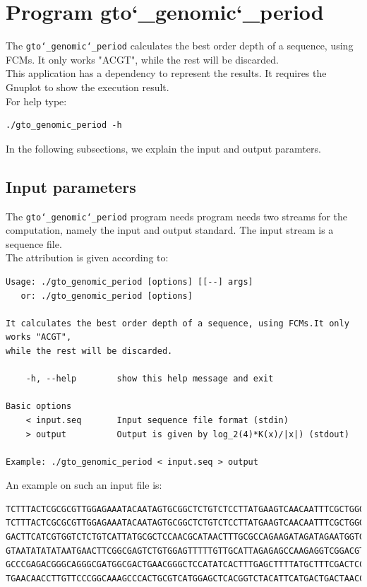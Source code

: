 \section{Program gto\char`_genomic\char`_period}
The \texttt{gto\char`_genomic\char`_period} calculates the best order depth of a sequence, using FCMs. It only works "ACGT", while the rest will be discarded.\\
This application has a dependency to represent the results. It requires the Gnuplot to show the execution result.\\
For help type:
\begin{lstlisting}
./gto_genomic_period -h
\end{lstlisting}
In the following subsections, we explain the input and output paramters.

\subsection*{Input parameters}

The \texttt{gto\char`_genomic\char`_period} program needs program needs two streams for the computation, namely the input and output standard. The input stream is a sequence file.\\
The attribution is given according to:
\begin{lstlisting}
Usage: ./gto_genomic_period [options] [[--] args]
   or: ./gto_genomic_period [options]

It calculates the best order depth of a sequence, using FCMs.It only works "ACGT", 
while the rest will be discarded.

    -h, --help        show this help message and exit

Basic options
    < input.seq       Input sequence file format (stdin)
    > output          Output is given by log_2(4)*K(x)/|x|) (stdout)

Example: ./gto_genomic_period < input.seq > output
\end{lstlisting}
An example on such an input file is:
\begin{lstlisting}
TCTTTACTCGCGCGTTGGAGAAATACAATAGTGCGGCTCTGTCTCCTTATGAAGTCAACAATTTCGCTGGGACTTGCGGC
TCTTTACTCGCGCGTTGGAGAAATACAATAGTGCGGCTCTGTCTCCTTATGAAGTCAACAATTTCGCTGGGACTTGCGGC
GACTTCATCGTGGTCTCTGTCATTATGCGCTCCAACGCATAACTTTGCGCCAGAAGATAGATAGAATGGTGTAAGAAACT
GTAATATATATAATGAACTTCGGCGAGTCTGTGGAGTTTTTGTTGCATTAGAGAGCCAAGAGGTCGGACGTCCTCACGTA
GCCCGAGACGGGCAGGGCGATGGCGACTGAACGGGCTCCATATCACTTTGAGCTTTTATGCTTTCGACTCCTCCAGGAGC
TGAACAACCTTGTTCCCGGCAAAGCCCACTGCGTCATGGAGCTCACGGTCTACATTCATGACTGACTAACCGTAAACTGC
\end{lstlisting}

